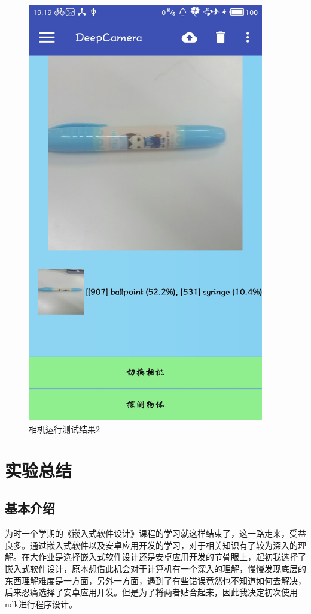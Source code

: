 \documentclass[UTF8, Microsoft YaHei]{book}
\begin{document}
\begin{figure}[!htb]
\begin{minipage}[c]{0.33\textwidth}
    \includegraphics[width=0.92\textwidth]{img/test5.png}
    \end{minipage}
    \caption{相机运行测试结果2}
    \end{figure}

    \chapter{实验总结}
    \section{基本介绍}
    为时一个学期的《嵌入式软件设计》课程的学习就这样结束了，这一路走来，受益良多。通过嵌入式软件以及安卓应用开发的学习，对于相关知识有了较为深入的理解。在大作业是选择嵌入式软件设计还是安卓应用开发的节骨眼上，起初我选择了嵌入式软件设计，原本想借此机会对于计算机有一个深入的理解，慢慢发现底层的东西理解难度是一方面，另外一方面，遇到了有些错误竟然也不知道如何去解决，后来忍痛选择了安卓应用开发。但是为了将两者贴合起来，因此我决定初次使用ndk进行程序设计。
\end{document}
